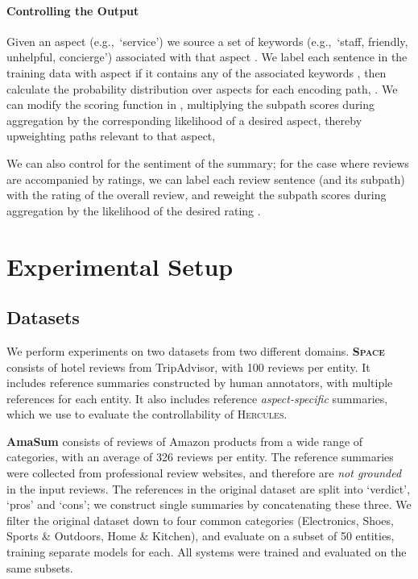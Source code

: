 \documentclass[11pt]{article}
\begin{document}
\paragraph{Controlling the Output} Given an aspect  (e.g.,~`service') we source a set of keywords  (e.g.,~`staff, friendly, unhelpful, concierge') associated with that aspect \cite{angelidis-etal-2021-extractive}. We label each sentence in the training data with aspect  if it contains any of the associated keywords , then calculate the probability distribution over aspects for each encoding path, . We can modify the scoring function in , multiplying the subpath scores during aggregation by the corresponding likelihood of a desired aspect, thereby upweighting paths relevant to that aspect,


We can also control for the sentiment of the summary; for the case where reviews are accompanied by ratings, we can label each review sentence (and its subpath) with the rating  of the overall review, and reweight the subpath scores during aggregation by the likelihood of the desired rating .






\section{Experimental Setup}
\label{sec:experiments}

\subsection{Datasets}
\label{sec:datasets}

We perform experiments on two datasets from two different domains. \textsc{\textbf{Space}} \cite{angelidis-etal-2021-extractive} consists of hotel reviews from TripAdvisor, with 100 reviews per entity. It includes reference summaries constructed by human annotators, with multiple references for each entity. It also includes reference \textit{aspect-specific} summaries, which we use to evaluate the controllability of \textsc{Hercules}.


\textbf{AmaSum} \cite{brazinskas-etal-2021-learning} consists of reviews of Amazon products from a wide range of categories, with an average of 326 reviews per entity. The reference summaries were collected from professional review websites, and therefore are \emph{not grounded} in the input reviews. The references in the original dataset are split into `verdict', `pros' and `cons'; we construct single summaries by concatenating these three. We filter the original dataset down to four common categories (Electronics, Shoes, Sports \& Outdoors, Home \& Kitchen), and evaluate on a subset of 50 entities, training separate models for each. All systems were trained and evaluated on the same subsets.
\end{document}
